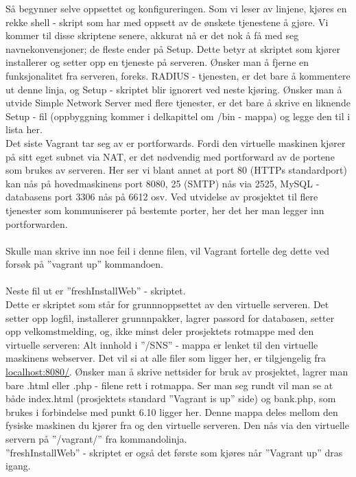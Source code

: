 \documentclass{article}
\begin{document}
Så begynner selve oppsettet og konfigureringen. Som vi leser av linjene, kjøres en rekke shell - skript som har med oppsett av de ønskete tjenestene å gjøre. Vi kommer til disse skriptene senere, akkurat nå er det nok å få med seg navnekonvensjoner; de fleste ender på Setup. Dette betyr at skriptet som kjører installerer og setter opp en tjeneste på serveren. Ønsker man å fjerne en funksjonalitet fra serveren, foreks. RADIUS - tjenesten, er det bare å kommentere ut denne linja, og Setup - skriptet blir ignorert ved neste kjøring. Ønsker man å utvide Simple Network Server med flere tjenester, er det bare å skrive en liknende Setup - fil (oppbyggning kommer i delkapittel om /bin - mappa) og legge den til i lista her. \\
Det siste Vagrant tar seg av er portforwards. Fordi den virtuelle maskinen kjører på sitt eget subnet via NAT, er det nødvendig med portforward av de portene som brukes av serveren. Her ser vi blant annet at port 80 (HTTPs standardport) kan nås på hovedmaskinens port 8080, 25 (SMTP) nås via 2525, MySQL - databasens port 3306 nås på 6612 osv. Ved utvidelse av prosjektet til flere tjenester som kommuniserer på bestemte porter, her det her man legger inn portforwarden. \\ \\
Skulle man skrive inn noe feil i denne filen, vil Vagrant fortelle deg dette ved forsøk på ''vagrant up'' kommandoen. 
\\ \\
Neste fil ut er ''freshInstallWeb'' - skriptet. \\
Dette er skriptet som står for grunnnoppsettet av den virtuelle serveren. Det setter opp logfil, installerer grunnnpakker, lagrer passord for databasen, setter opp velkomstmelding, og, ikke minst deler prosjektets rotmappe med den virtuelle serveren: Alt innhold i ''/SNS'' - mappa er lenket til den virtuelle maskinens webserver. Det vil si at alle filer som ligger her, er tilgjengelig fra \url{localhost:8080/}. Ønsker man å skrive nettsider for bruk av prosjektet, lagrer man bare .html eller .php - filene rett i rotmappa. Ser man seg rundt vil man se at både index.html (prosjektets standard ''Vagrant is up'' side) og bank.php, som brukes i forbindelse med punkt 6.10 ligger her. Denne mappa deles mellom den fysiske maskinen du kjører fra og den virtuelle serveren. Den nås via den virtuelle servern på ''/vagrant/'' fra kommandolinja. \\
''freshInstallWeb'' - skriptet er også det første som kjøres når ''Vagrant up'' dras igang.
\end{document}
